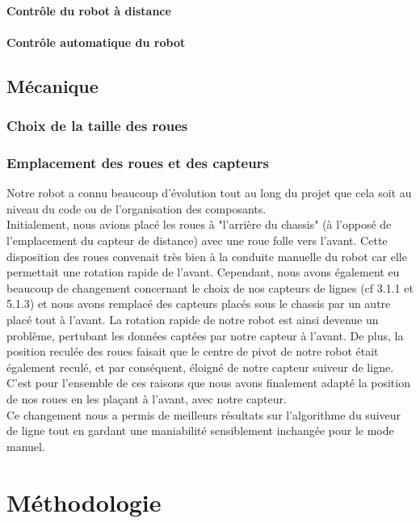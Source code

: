 \documentclass[a4paper, 12pt]{report}
\begin{document}
\subsubsection*{Contrôle du robot à distance}

\subsubsection*{Contrôle automatique du robot}

\section{Mécanique}
\subsection{Choix de la taille des roues}
\subsection{Emplacement des roues et des capteurs}
Notre robot a connu beaucoup d'évolution tout au long du projet que cela soit au niveau du code ou de l'organisation des composants.
\\
Initialement, nous avions placé les roues à "l'arrière du chassis" (à l'opposé de l'emplacement du capteur de distance) avec une roue folle vers l'avant. Cette disposition des roues convenait très bien à la conduite manuelle du robot car elle permettait une rotation rapide de l'avant. Cependant, nous avons également eu beaucoup de changement concernant le choix de nos capteurs de lignes (cf 3.1.1 et 5.1.3) et nous avons remplacé des capteurs placés sous le chassis par un autre placé tout à l'avant. La rotation rapide de notre robot est ainsi devenue un problème, pertubant les données captées par notre capteur à l'avant. De plus, la position reculée des roues faisait que le centre de pivot de notre robot était également reculé, et par conséquent, éloigné de notre capteur suiveur de ligne. C'est pour l'ensemble de ces raisons que nous avons finalement adapté la position de nos roues en les plaçant à l'avant, avec notre capteur.
\\
Ce changement nous a permis de meilleurs résultats sur l'algorithme du suiveur de ligne tout en gardant une maniabilité sensiblement inchangée pour le mode manuel.
\chapter{Méthodologie}
\lipsum[5-6]
\end{document}
